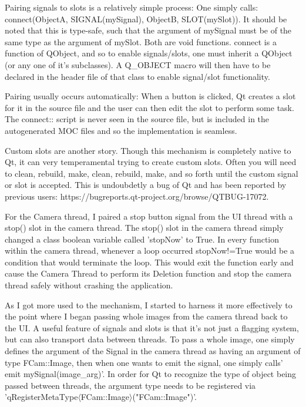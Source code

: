 Pairing signals to slots is a relatively simple process: One simply calls:   connect(ObjectA, SIGNAL(mySignal), ObjectB, SLOT(mySlot)).
It should be noted that this is type-safe, such that the argument of mySignal must be of the same type as the argument of mySlot. Both are void functions.
connect is a function of QObject, and so to enable signals/slots, one must inherit a QObject (or any one of it's subclasses). A Q\_OBJECT macro will then have to be declared in the header file of that class to enable signal/slot functionality. 

Pairing usually occurs automatically: When a button is clicked, Qt creates a slot for it in the source file and the user can then edit the slot to perform some task. The connect:: script is never seen in the source file, but is included in the autogenerated MOC files and so the implementation is seamless.

Custom slots are another story. Though this mechanism is completely native to Qt, it can very temperamental trying to create custom slots. Often you will need to clean, rebuild, make, clean, rebuild, make, and so forth until the custom signal or slot is accepted. This is undoubdetly a bug of Qt and has been reported by previous users: https://bugreports.qt-project.org/browse/QTBUG-17072.

For the Camera thread, I paired a stop button signal from the UI thread with a stop() slot in the camera thread. The stop() slot in the camera thread simply changed a class boolean variable called 'stopNow' to True.  In every function within the camera thread, whenever a loop occurred  stopNow!=True would be a condition that would terminate the loop. This would exit the function early and cause the Camera Thread to perform its Deletion function and stop the camera thread safely without crashing the application.

As I got more used to the mechanism, I started to harness it more effectively to the point where I began passing whole images from the camera thread back to the UI. A useful feature of signals and slots is that it's not just a flagging system, but can also transport data between threads.  To pass a whole image, one simply defines the argument of the Signal in the camera thread as having an argument of type FCam::Image, then when one wants to emit the signal, one simply calls' emit mySignal(image\_arg)'. In order for Qt to recognize the type of object being passed between threads, the argument type needs to be registered via 'qRegisterMetaType\(\langle\)FCam::Image\(\rangle\)("FCam::Image")'.

